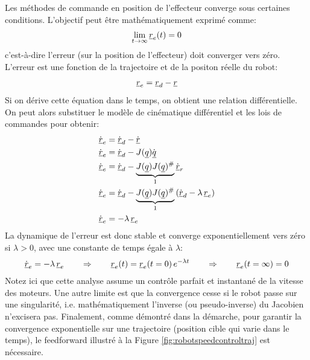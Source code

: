 Les méthodes de commande en position de l'effecteur converge sous certaines conditions. L'objectif peut être mathématiquement exprimé comme:
\begin{align}
\lim_{t \rightarrow \infty } \underline{r}_e(t) = 0 
\end{align}
c'est-à-dire l'erreur (sur la position de l'effecteur) doit converger vers zéro. L'erreur est une fonction de la trajectoire et de la positon réelle du robot:
\begin{align}
\underline{r}_e = \underline{r}_d - \underline{r}
\end{align}
Si on dérive cette équation dans le temps, on obtient une relation différentielle. On peut alors substituer le modèle de cinématique différentiel et les lois de commandes pour obtenir:
\begin{align}
\dot{\underline{r}}_e  &= \dot{\underline{r}}_d - \dot{\underline{r}} \\
\dot{\underline{r}}_e  &= \dot{\underline{r}}_d - J(\underline{q}) \dot{\underline{q}} \\
\dot{\underline{r}}_e  &= \dot{\underline{r}}_d - \underbrace{J(\underline{q}) J(\underline{q})^{\#} }_{1} \dot{\underline{r}}_r \\
\dot{\underline{r}}_e  &= \dot{\underline{r}}_d - \underbrace{J(\underline{q}) J(\underline{q})^{\#} }_{1}  \left( \dot{\underline{r}}_d - \lambda \, \underline{r}_e \right) \\
\dot{\underline{r}}_e  &= - \lambda \, \underline{r}_e  
\end{align}
La dynamique de l'erreur est donc stable et converge exponentiellement vers zéro si $\lambda>0$, avec une constante de temps égale à $\lambda$:
\begin{align}
\dot{\underline{r}}_e = - \lambda \, \underline{r}_e 
\quad\quad \Rightarrow \quad\quad 
\underline{r}_e(t) = \underline{r}_e(t=0) \, e^{- \lambda t} 
\quad\quad \Rightarrow \quad\quad 
\underline{r}_e(t=\infty) = 0
\end{align}
Notez ici que cette analyse assume un contrôle parfait et instantané de la vitesse des moteurs. Une autre limite est que la convergence cesse si le robot passe sur une singularité, i.e. mathématiquement l'inverse (ou pseudo-inverse) du Jacobien n'excisera pas. Finalement, comme démontré dans la démarche, pour garantir la convergence exponentielle sur une trajectoire (position cible qui varie dans le temps), le feedforward illustré à la Figure \ref{fig:robotspeedcontroltraj} est nécessaire.



